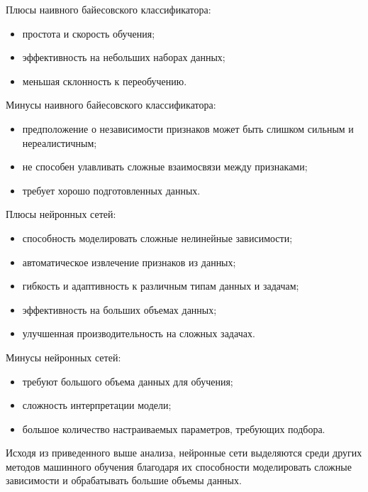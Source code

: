 Плюсы наивного байесовского классификатора:
\begin{itemize}
    \item простота и скорость обучения;
    \item эффективность на небольших наборах данных;
    \item меньшая склонность к переобучению.
\end{itemize}

Минусы наивного байесовского классификатора:
\begin{itemize}
    \item предположение о независимости признаков может быть слишком сильным и нереалистичным;
    \item не способен улавливать сложные взаимосвязи между признаками;
    \item требует хорошо подготовленных данных.
\end{itemize}

Плюсы нейронных сетей:
\begin{itemize}
    \item способность моделировать сложные нелинейные зависимости;
    \item автоматическое извлечение признаков из данных;
    \item гибкость и адаптивность к различным типам данных и задачам;
    \item эффективность на больших объемах данных;
    \item улучшенная производительность на сложных задачах.
\end{itemize}

Минусы нейронных сетей:
\begin{itemize}
    \item требуют большого объема данных для обучения;
    \item сложность интерпретации модели;
    \item большое количество настраиваемых параметров, требующих подбора.
\end{itemize}

Исходя из приведенного выше анализа, нейронные сети выделяются среди других методов машинного обучения благодаря их способности моделировать сложные зависимости и обрабатывать большие объемы данных.


